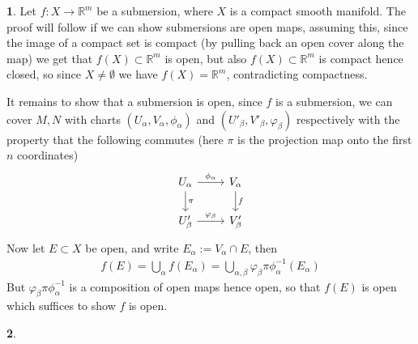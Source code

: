 \documentclass[10.5pt]{article}
\theoremstyle{definition}
\newtheorem{pb}{}
\begin{document}
    \begin{pb}
        Let \(f: X \to \mathbb{R}^m\) be a submersion, where \(X\) is a compact smooth manifold. The proof will follow if we can show submersions are open maps, assuming this, since the image of a compact set is compact (by pulling back an open cover along the map) we get that \(f(X) \subset \mathbb{R}^m\) is open, but also \(f(X) \subset \mathbb{R}^m\) is compact hence closed, so since \(X \neq \emptyset\) we have \(f(X) = \mathbb{R}^m\), contradicting compactness.

        It remains to show that a submersion is open, since \(f\) is a submersion, we can cover \(M,N\) with charts \((U_\alpha,V_\alpha,\phi_\alpha)\) and \((U'_\beta,V'_\beta,\varphi_\beta)\) respectively with the property that the following commutes (here \(\pi\) is the projection map onto the first \(n\) coordinates)
        \begin{equation*}
            \begin{tikzcd}
                U_\alpha \arrow[d,"\pi"] \arrow[r,"\phi_\alpha"] &V_\alpha \arrow[d,"f"]\\
                U_\beta' \arrow[r,"\varphi_\beta"] &V_\beta'
            \end{tikzcd}
        \end{equation*}
        Now let \(E \subset X\) be open, and write \(E_\alpha := V_\alpha \cap E\), then
        \begin{align*}
            f(E) = \bigcup_\alpha f(E_\alpha) = \bigcup_{\alpha,\beta} \varphi_\beta\pi\phi_\alpha^{-1}(E_\alpha)
        \end{align*}
        But \(\varphi_\beta\pi\phi_\alpha^{-1}\) is a composition of open maps hence open, so that \(f(E)\) is open which suffices to show \(f\) is open.
    \end{pb}
    \begin{pb}
        
    \end{pb}
\end{document}
